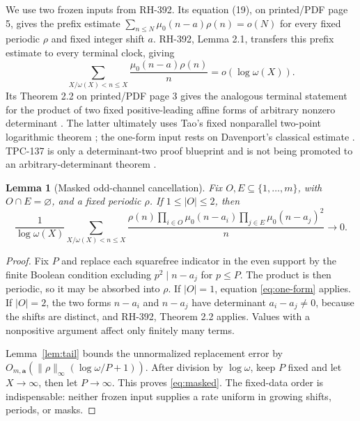\documentclass[11pt]{article}
\newtheorem{lemma}[theorem]{Lemma}
\theoremstyle{definition}
\theoremstyle{remark}
\newcommand{\mob}{\mu}
\begin{document}
We use two frozen inputs from RH-392.  Its equation (19), on printed/PDF
page 5, gives the prefix estimate
\(\sum_{n\le N}\mob_0(n-a)\rho(n)=o(N)\) for every fixed periodic
\(\rho\) and fixed integer shift \(a\).  RH-392, Lemma 2.1, transfers this
prefix estimate to every terminal clock, giving
\begin{equation}
 \sum_{X/\omega(X)<n\le X}\frac{\mob_0(n-a)\rho(n)}n
 =o(\log\omega(X)).
 \label{eq:one-form}
\end{equation}
Its Theorem 2.2 on printed/PDF page 3 gives the analogous terminal statement
for the product of two fixed positive-leading affine forms of arbitrary
nonzero determinant
\cite{RH392}.  The latter ultimately uses Tao's fixed nonparallel
two-point logarithmic theorem \cite{Tao2016LogChowla}; the one-form input
rests on Davenport's classical estimate \cite{Davenport1937}.  TPC-137 is
only a determinant-two proof blueprint and is not being promoted to an
arbitrary-determinant theorem \cite{TPC137}.

\begin{lemma}[Masked odd-channel cancellation]
\label{lem:masked}
Fix \(O,E\subseteq\{1,\ldots,m\}\), with \(O\cap E=\varnothing\), and a
fixed periodic \(\rho\).  If \(1\le|O|\le2\), then
\begin{equation}
 \frac1{\log\omega(X)}\sum_{X/\omega(X)<n\le X}
 \frac{\rho(n)\prod_{i\in O}\mob_0(n-a_i)
       \prod_{j\in E}\mob_0(n-a_j)^2}{n}\longrightarrow0.
 \label{eq:masked}
\end{equation}
\end{lemma}

\begin{proof}
Fix \(P\) and replace each squarefree indicator in the even support by the
finite Boolean condition excluding \(p^2\mid n-a_j\) for \(p\le P\).
The product is then periodic, so it may be absorbed into \(\rho\).  If
\(|O|=1\), equation \eqref{eq:one-form} applies.  If \(|O|=2\), the two
forms \(n-a_i\) and \(n-a_j\) have determinant \(a_i-a_j\ne0\), because
the shifts are distinct, and RH-392, Theorem 2.2 applies.  Values with a
nonpositive argument affect only finitely many terms.

Lemma~\ref{lem:tail} bounds the unnormalized replacement error by
\(O_{m,\mathbf a}(\|\rho\|_\infty(\log\omega/P+1))\).  After division by
\(\log\omega\), keep \(P\)
fixed and let \(X\to\infty\), then let \(P\to\infty\).  This proves
\eqref{eq:masked}.  The fixed-data order is indispensable: neither frozen
input supplies a rate uniform in growing shifts, periods, or masks.
\end{proof}
\end{document}

